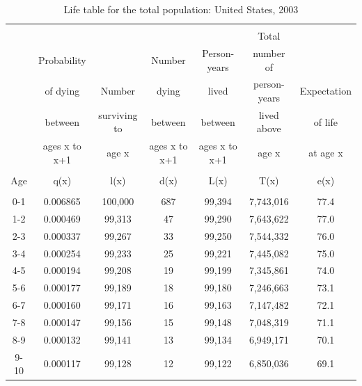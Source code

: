 \documentclass[10pt,a4paper]{article}
\begin{document}
\begin{longtable}{|c|c|c|c|c|c|c|}
\caption{Life table for the total population: United States, 2003 \citep{Arias2007}}\\
 \hline \\
      &               &              &               &               & Total        &              \\
       & Probability   &              & Number        & Person-years  & number of    &              \\
       & of dying      & Number       & dying         & lived         & person-years & Expectation  \\
       & between       & surviving to & between       & between       & lived above  & of life      \\
       & ages x to x+1 & age x        & ages x to x+1 & ages x to x+1 & age x        & at age x     \\
\hline  \\
Age    & q(x)          & l(x)         & d(x)          & L(x)          & T(x)         & e(x)         \\
\hline \\
0-1    & 0.006865      & 100,000      & 687           & 99,394        & 7,743,016    & 77.4         \\
1-2    & 0.000469      & 99,313       & 47            & 99,290        & 7,643,622    & 77.0         \\
2-3    & 0.000337      & 99,267       & 33            & 99,250        & 7,544,332    & 76.0         \\
3-4    & 0.000254      & 99,233       & 25            & 99,221        & 7,445,082    & 75.0         \\
4-5    & 0.000194      & 99,208       & 19            & 99,199        & 7,345,861    & 74.0         \\
5-6    & 0.000177      & 99,189       & 18            & 99,180        & 7,246,663    & 73.1         \\
6-7    & 0.000160      & 99,171       & 16            & 99,163        & 7,147,482    & 72.1         \\
7-8    & 0.000147      & 99,156       & 15            & 99,148        & 7,048,319    & 71.1         \\
8-9    & 0.000132      & 99,141       & 13            & 99,134        & 6,949,171    & 70.1         \\
9-10   & 0.000117      & 99,128       & 12            & 99,122        & 6,850,036    & 69.1         \\

\end{longtable}
\end{document}
